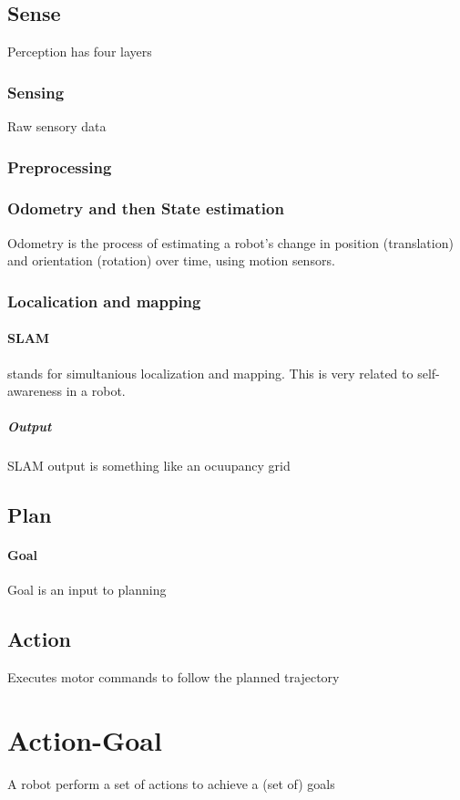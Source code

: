     \subsection{Sense}
        Perception has four layers
        \subsubsection{Sensing}
            Raw sensory data
        \subsubsection{Preprocessing}
        \subsubsection{Odometry and then State estimation}
            Odometry is the process of estimating a robot’s change in position (translation) and orientation (rotation) over time, using motion sensors.
        \subsubsection{Localication and mapping}
            \paragraph{SLAM}
                stands for simultanious localization and mapping. This is very related to self-awareness in a robot.
                    \subparagraph{Output}
                    SLAM output is  something like an ocuupancy grid
    
    \subsection{Plan}
        \paragraph{Goal} Goal is an input to planning
    \subsection{Action}
        Executes motor commands to follow the planned trajectory
            

\section{Action-Goal}
    A robot perform a set of actions to achieve a (set of) goals
